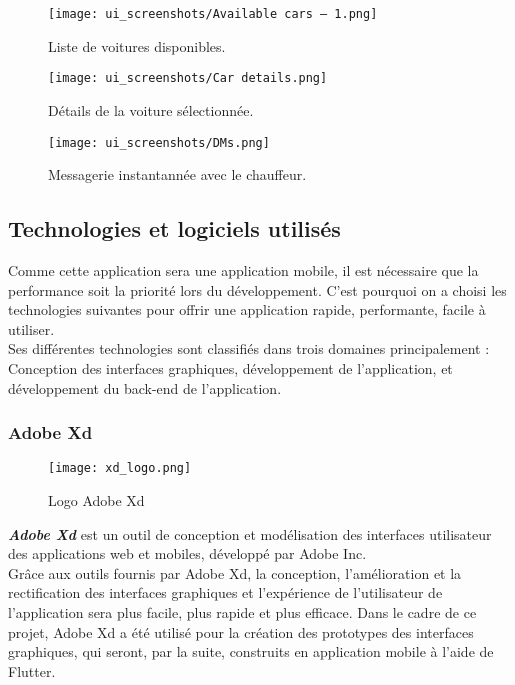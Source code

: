 \newpage
\begin{multicols}{2}
    \begin{figure}[H]
        \centering
        \texttt{[image: ui\_screenshots/Available cars – 1.png]}
        \vspace{1cm}
        \caption{\centering Liste de voitures disponibles.}
        \label{fig:available_cars}
    \end{figure}
    \begin{figure}[H]
        \centering
        \texttt{[image: ui\_screenshots/Car details.png]}
        \vspace{1cm}
        \caption{\centering Détails de la voiture sélectionnée.}
        \label{fig:car_details}
    \end{figure}
\end{multicols}
\vspace{1cm}
\begin{figure}[H]
    \centering
    \texttt{[image: ui\_screenshots/DMs.png]}
    \vspace{1cm}
    \caption{\centering Messagerie instantannée avec le chauffeur.}
    \label{fig:dms}
\end{figure}

\subsection{Technologies et logiciels utilisés}
Comme cette application sera une application mobile, il est nécessaire que la performance soit la priorité lors du développement. C'est pourquoi on a choisi les technologies suivantes pour offrir une application rapide, performante, facile à utiliser.\\
\noindent Ses différentes technologies sont classifiés dans trois domaines principalement : Conception des interfaces graphiques, développement de l'application, et développement du back-end de l'application.\\
\subsubsection{Adobe Xd}
\vspace{1cm}
\begin{figure}[H]
    \centering
    \texttt{[image: xd\_logo.png]}
    \vspace{1cm}
    \caption{Logo Adobe Xd}
    \label{fig:xd_logo}
\end{figure}
\textit{\textbf{Adobe Xd}} est un outil de conception et modélisation des interfaces utilisateur des applications web et mobiles, développé par Adobe Inc.\\
\noindent Grâce aux outils fournis par Adobe Xd, la conception, l'amélioration et la rectification des interfaces graphiques et l'expérience de l'utilisateur de l'application sera plus facile, plus rapide et plus efficace.
\noindent Dans le cadre de ce projet, Adobe Xd a été utilisé pour la création des prototypes des interfaces graphiques, qui seront, par la suite, construits en application mobile à l'aide de Flutter.
